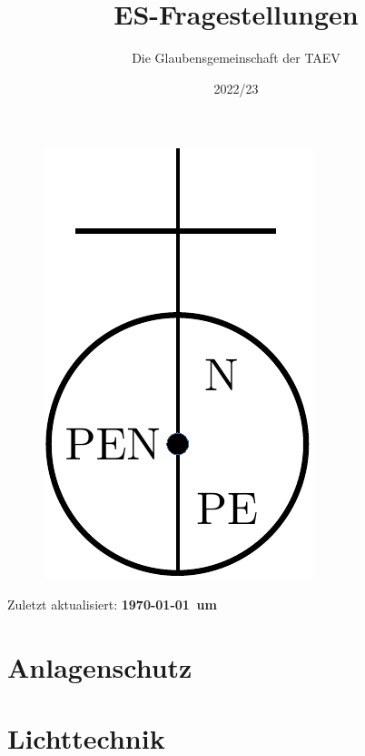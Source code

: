 \documentclass[12pt]{article}
\title{\LARGE \textbf{ES-Fragestellungen}}
\date{2022/23}
\author{Die Glaubensgemeinschaft der TAEV}
\begin{document}
    \lhead{}
    \rhead{}

    \begin{titlepage}
        \begin{figure}
            \centering
            \includegraphics{nullung.pdf}
        \end{figure}

        \maketitle 
        \begin{center}
            Zuletzt aktualisiert: \textbf{\today \, um \currenttime}
        \end{center}
        \clearpage
        \tableofcontents
    \end{titlepage}


    \cfoot{}


    \section{Anlagenschutz}
    
    

    \section{Lichttechnik}
    
    
\end{document}
